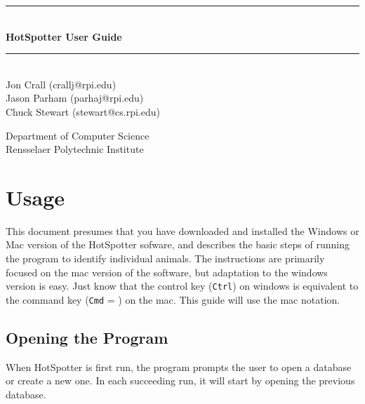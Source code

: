 \documentclass[a4paper,10pt]{article}
\newcommand{\HRule}{\rule{\linewidth}{0.5mm}}
\begin{document}
\begin{titlepage}
    \vspace*{\fill}

    \begin{center}

        \HRule \\[0.4cm]
        { \huge \bfseries HotSpotter User Guide}\\[0.4cm]
        \HRule \\[1.5cm]

        Jon Crall (crallj@rpi.edu)\\
        Jason Parham (parhaj@rpi.edu) \\
        Chuck Stewart (stewart@cs.rpi.edu) \\ 

        \medskip

        Department of Computer Science \\
        Rensselaer Polytechnic Institute

    \end{center}

    \vspace*{\fill}
\end{titlepage}

\DeclareRobustCommand{\cmdkey}{\raisebox{-.035em}{\texttt{[image: command]}}}

\section{Usage}  This document presumes that you have downloaded and installed
the Windows or Mac version of the HotSpotter sofware, and describes the basic
steps of running the program to identify individual animals. The instructions
are primarily focused on the mac version of the software, but adaptation to
the windows version is easy. Just know that the control key ({\tt Ctrl}) on windows
is equivalent to the command key ({\tt Cmd} = \cmdkey) on the mac. This guide will use the
mac notation.

    \subsection{Opening the Program}
    When HotSpotter is first run, the program prompts the user to open a
    database or create a new one.  In each succeeding run, it will start by
    opening the previous database. 

    \renewcommand{\textrightarrow}{$\rightarrow$}
    \newcommand{\textcmd}{\cmdkey}
\end{document}
